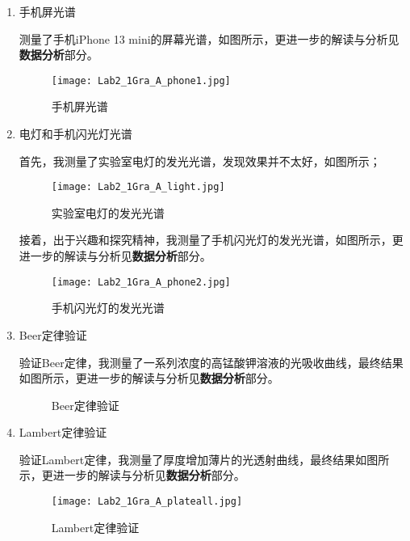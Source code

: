 \documentclass[dvipsnames, svgnames,a4paper,11pt]{article}
\begin{document}
\begin{enumerate}
		\item 手机屏光谱
		
		测量了手机iPhone 13 mini的屏幕光谱，如图所示，更进一步的解读与分析见\textbf{数据分析}部分。
		
		\begin{figure}[htbp]
			\centering
			\texttt{[image: Lab2\_1Gra\_A\_phone1.jpg]}
			\caption{手机屏光谱}
			\label{fig:figA6}
		\end{figure}
		
		\clearpage
		\item 电灯和手机闪光灯光谱
		
		首先，我测量了实验室电灯的发光光谱，发现效果并不太好，如图所示；
		
		\begin{figure}[htbp]
			\centering
			\texttt{[image: Lab2\_1Gra\_A\_light.jpg]}
			\caption{实验室电灯的发光光谱}
			\label{fig:figA7}
		\end{figure}
		
		接着，出于兴趣和探究精神，我测量了手机闪光灯的发光光谱，如图所示，更进一步的解读与分析见\textbf{数据分析}部分。
		
		\begin{figure}[htbp]
			\centering
			\texttt{[image: Lab2\_1Gra\_A\_phone2.jpg]}
			\caption{手机闪光灯的发光光谱}
			\label{fig:figA8}
		\end{figure}
		
		\clearpage
		\item Beer定律验证
		
		验证Beer定律，我测量了一系列浓度的高锰酸钾溶液的光吸收曲线，最终结果如图所示，更进一步的解读与分析见\textbf{数据分析}部分。
		
		\begin{figure}[htbp]
			\centering
			\caption{Beer定律验证}
			\label{fig:figA9}			
		\end{figure}
		
		\item Lambert定律验证
		
		验证Lambert定律，我测量了厚度增加薄片的光透射曲线，最终结果如图所示，更进一步的解读与分析见\textbf{数据分析}部分。
		
		\begin{figure}[htbp]
			\centering
			\texttt{[image: Lab2\_1Gra\_A\_plateall.jpg]}
			\caption{Lambert定律验证}
			\label{fig:figA10}
		\end{figure}
		
	\end{enumerate}
	
\end{document}
